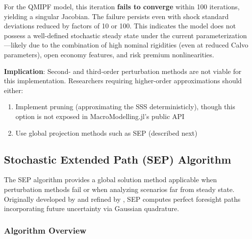 \documentclass[12pt]{article}
\begin{document}
For the QMIPF model, this iteration \textbf{fails to converge} within 100 iterations, yielding a singular Jacobian. The failure persists even with shock standard deviations reduced by factors of 10 or 100. This indicates the model does not possess a well-defined stochastic steady state under the current parameterization---likely due to the combination of high nominal rigidities (even at reduced Calvo parameters), open economy features, and risk premium nonlinearities.

\textbf{Implication}: Second- and third-order perturbation methods are not viable for this implementation. Researchers requiring higher-order approximations should either:
\begin{enumerate}
\item Implement pruning (approximating the SSS deterministicly), though this option is not exposed in MacroModelling.jl's public API
\item Use global projection methods such as SEP (described next)
\end{enumerate}

\subsection{Stochastic Extended Path (SEP) Algorithm}\label{sec:sep_algorithm}

The SEP algorithm provides a global solution method applicable when perturbation methods fail or when analyzing scenarios far from steady state. Originally developed by \citet{fair1983solution} and refined by \citet{adjemian2013stochastic}, SEP computes perfect foresight paths incorporating future uncertainty via Gaussian quadrature.

\subsubsection{Algorithm Overview}
\end{document}
